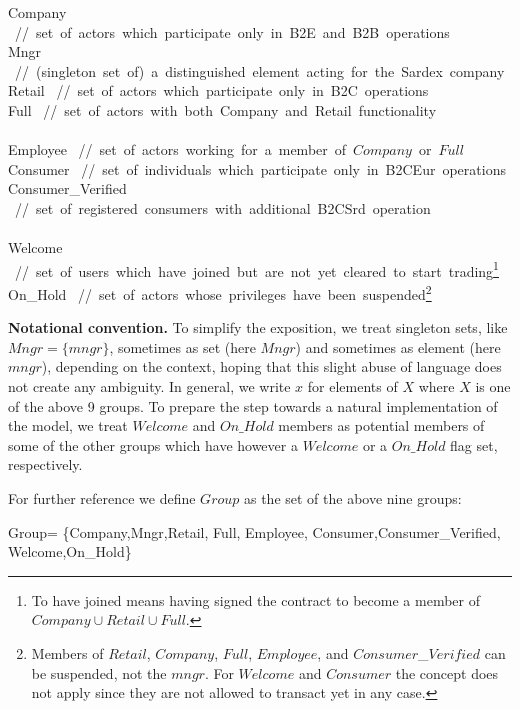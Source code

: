 \begin{asm}
Company \mbox{  // set of actors which participate only in B2E and B2B operations}\\
Mngr 
  \mbox{  // (singleton set of) a distinguished element 
  	acting for the Sardex company}\\
Retail \mbox{  // set of actors which participate only in B2C operations}\\
Full \mbox{  // set of actors with both Company and Retail functionality}\\ 
\\
Employee \mbox{  // set of actors working for a member of $Company$ or $Full$}\\
Consumer \mbox{  // set of individuals which participate only in B2CEur operations} \\
Consumer\_Verified \mbox{  // set of registered consumers with additional B2CSrd operation} \\ 
\\
Welcome \mbox{  // set of users which have joined but are not yet cleared to start trading}\footnote{To have joined means having signed the contract to become a member of $Company \cup Retail \cup Full$.}\\
On\_Hold \mbox{  // set of actors whose privileges have been suspended}\footnote{Members of $Retail$, $Company$, $Full$, $Employee$, and $Consumer$\_$Verified$ can be suspended, not the $mngr$. For $Welcome$ and $Consumer$ the concept does not apply since they are not allowed to transact yet in any case.}
\end{asm}


{\bf Notational convention.} To simplify the exposition, we treat singleton sets, like $Mngr=\{mngr\}$, sometimes as set (here $Mngr$) and sometimes as element (here $mngr$), depending on the context, hoping that this slight abuse of language does not create any ambiguity. In general, we write $x$ for elements of $X$ where $X$ is one of the above 9 groups. To prepare the step towards a natural implementation of the model, we treat $Welcome$ and $On\_Hold$ members as potential members of some of the other groups which have however a $Welcome$ or a $On\_Hold$ flag set, respectively.

For further reference we define $Group$ as the set of the above nine groups:
\begin{asm}
Group= \+
       \{Company,Mngr,Retail, Full, Employee,\+
             Consumer,Consumer\_Verified, Welcome,On\_Hold\}
\end{asm}

